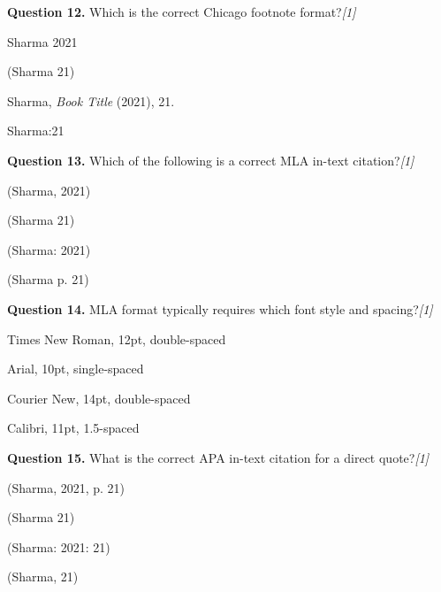 \documentclass[11pt,a4paper]{article}
\newcommand{\pts}[1]{\hfill   \textit{[#1]}}
\begin{document}
\noindent   \textbf{Question 12.} Which is the correct Chicago footnote format?\pts{1}

\begin{parts}
  \item Sharma 2021
  \item (Sharma 21)
  \item Sharma,   \textit{Book Title} (2021), 21.
  \item Sharma:21
\end{parts}

\medskip




\noindent   \textbf{Question 13.} Which of the following is a correct MLA in-text citation?\pts{1}

\begin{parts}
  \item (Sharma, 2021)
  \item (Sharma 21)
  \item (Sharma: 2021)
  \item (Sharma p. 21)
\end{parts}

\medskip




\noindent   \textbf{Question 14.} MLA format typically requires which font style and spacing?\pts{1}

\begin{parts}
  \item Times New Roman, 12pt, double-spaced
  \item Arial, 10pt, single-spaced
  \item Courier New, 14pt, double-spaced
  \item Calibri, 11pt, 1.5-spaced
\end{parts}

\medskip




\noindent   \textbf{Question 15.} What is the correct APA in-text citation for a direct quote?\pts{1}

\begin{parts}
  \item (Sharma, 2021, p. 21)
  \item (Sharma 21)
  \item (Sharma: 2021: 21)
  \item (Sharma, 21)
\end{parts}

\medskip
\end{document}
